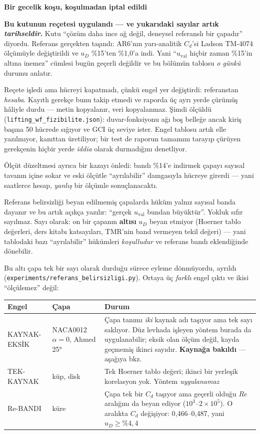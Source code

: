 \documentclass[11pt,a4paper]{article}
\newcommand{\kkkenar}{lacivert}
\newcommand{\kkzemin}{kod}
\newenvironment{renkkutu}[3]{%
  \renewcommand{\kkkenar}{#1}\renewcommand{\kkzemin}{#2}%
  \par\medskip\noindent
  \begin{lrbox}{\kutugovde}%
  \begin{minipage}{\dimexpr\linewidth-2\fboxsep-2\fboxrule\relax}\footnotesize
  \textcolor{#1}{\textbf{#3}}\par\vspace{3pt}%
}{%
  \end{minipage}%
  \end{lrbox}%
  \noindent\fcolorbox{\kkkenar}{\kkzemin}{\usebox{\kutugovde}}%
  \par\medskip
}
\newenvironment{reddedilir}[1]{\begin{renkkutu}{kotu}{kotubg}{#1}}{\end{renkkutu}}
\begin{document}
\begin{reddedilir}{Bir gecelik koşu, koşulmadan iptal edildi}
\textbf{Bu kutunun reçetesi uygulandı --- ve yukarıdaki sayılar artık
\emph{tarihseldir}.} Kutu ``çözüm daha ince ağ değil, deneysel referanslı bir
çapadır'' diyordu. Referans gerçekten taşındı: AR6'nın yarı-analitik $C_d$'si
Ladson TM-4074 ölçümüyle değiştirildi ve $u_D$ \%15'ten \%1{,}0'a indi. Yani
``$u_{\mathrm{val}}$ hiçbir zaman \%15'in altına inemez'' cümlesi bugün
geçerli değildir ve bu bölümün tablosu \emph{o günkü} durumu anlatır.

\noindent Reçete işledi ama hücreyi kapatmadı, çünkü engel yer değiştirdi:
referanstan \emph{hesaba}. Kayıtlı gerekçe bunu takip etmedi ve raporda üç
ayrı yerde çürümüş hâliyle durdu --- metin kopyalanır, veri kopyalanmaz.
Şimdi ölçüldü (\texttt{lifting\_wf\_fizibilite.json}): duvar-fonksiyonu
ağı boş belleğe ancak kiriş başına 50 hücrede sığıyor ve GCI üç
seviye ister. Engel tablosu artık elle yazılmıyor, kanıttan üretiliyor; bir
test de raporun tamamını tarayıp çürüyen gerekçenin hiçbir yerde \emph{iddia}
olarak durmadığını denetliyor.

Ölçüt düzeltmesi ayrıca bir kazayı önledi: bandı \%14'e indirmek çapayı
sayısal tavanın içine sokar ve eski ölçütle ``ayrılabilir'' damgasıyla hücreye
girerdi --- yani saatlerce hesap, \emph{yanlış} bir ölçümle sonuçlanacaktı.
\end{reddedilir}

\noindent Referans belirsizliği beyan edilmemiş çapalarda hüküm yalnız sayısal
banda dayanır ve bu artık açıkça yazılır: ``gerçek $u_{\mathrm{val}}$ bundan
büyüktür''. Yokluk sıfır sayılmaz. Sayı olarak: on bir çapanın \textbf{altısı}
$u_D$ beyan etmiyor (Hoerner tablo değerleri, ders kitabı katsayıları, TMR'nin
band vermeyen tekil değeri) --- yani tablodaki bazı ``ayrılabilir'' hükümleri
\emph{koşulludur} ve referans bandı eklendiğinde dönebilir.

Bu altı çapa tek bir sayı olarak durduğu sürece eyleme dönmüyordu, ayrıldı
(\texttt{experiments/referans\_belirsizligi.py}). Ortaya üç \emph{farklı} engel
çıktı ve ikisi ``ölçülemez'' değil:

\begin{center}\footnotesize
\begin{tabular}{@{}llp{7.6cm}@{}}
\toprule
\textbf{Engel} & \textbf{Çapa} & \textbf{Durum} \\
\midrule
KAYNAK-EKSİK & NACA0012 $\alpha{=}0$, Ahmed 25° &
  Çapa tanımı \emph{iki} kaynak adı taşıyor ama tek sayı saklıyor. Düz levhada
  işleyen yöntem burada da uygulanabilir; eksik olan ölçüm değil, kayda
  geçmemiş ikinci sayıdır. \textbf{Kaynağa bakıldı} --- aşağıya bkz. \\
TEK-KAYNAK & küp, disk &
  Tek Hoerner tablo değeri; ikinci bir yerleşik korelasyon yok. Yöntem
  \emph{uygulanamaz} \\
Re-BANDI & küre &
  Çapa tek bir $C_d$ taşıyor ama geçerli olduğu $Re$ aralığını da beyan ediyor
  ($10^3$--$2{\times}10^5$). O aralıkta $C_d$ değişiyor: 0{,}466--0{,}487, yani
  $u_D \ge \%4{,}4$ \\
\bottomrule
\end{tabular}
\end{center}
\end{document}
